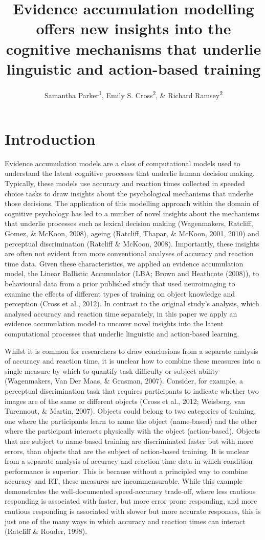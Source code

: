 \documentclass[
  man, donotrepeattitle,floatsintext]{apa6}
\title{Evidence accumulation modelling offers new insights into the cognitive mechanisms that underlie linguistic and action-based training}
\author{Samantha Parker\textsuperscript{1}, Emily S. Cross\textsuperscript{2}, \& Richard Ramsey\textsuperscript{2}}
\date{}
\affiliation{\vspace{0.5cm}\textsuperscript{1} Macquarie University\\\textsuperscript{2} ETH Zürich}
\begin{document}
\maketitle

\section{Introduction}\label{introduction}

Evidence accumulation models are a class of computational models used to understand the latent cognitive processes that underlie human decision making. Typically, these models use accuracy and reaction times collected in speeded choice tasks to draw insights about the psychological mechanisms that underlie those decisions. The application of this modelling approach within the domain of cognitive psychology has led to a number of novel insights about the mechanisms that underlie processes such as lexical decision making (Wagenmakers, Ratcliff, Gomez, \& McKoon, 2008), ageing (Ratcliff, Thapar, \& McKoon, 2001, 2010) and perceptual discrimination (Ratcliff \& McKoon, 2008). Importantly, these insights are often not evident from more conventional analyses of accuracy and reaction time data. Given these characteristics, we applied an evidence accumulation model, the Linear Ballistic Accumulator (LBA; Brown and Heathcote (2008)), to behavioural data from a prior published study that used neuroimaging to examine the effects of different types of training on object knowledge and perception (Cross et al., 2012). In contrast to the original study's analysis, which analysed accuracy and reaction time separately, in this paper we apply an evidence accumulation model to uncover novel insights into the latent computational processes that underlie linguistic and action-based learning.

Whilst it is common for researchers to draw conclusions from a separate analysis of accuracy and reaction time, it is unclear how to combine these measures into a single measure by which to quantify task difficulty or subject ability (Wagenmakers, Van Der Maas, \& Grasman, 2007). Consider, for example, a perceptual discrimination task that requires participants to indicate whether two images are of the same or different objects (Cross et al., 2012; Weisberg, van Turennout, \& Martin, 2007). Objects could belong to two categories of training, one where the participants learn to name the object (name-based) and the other where the participant interacts physically with the object (action-based). Objects that are subject to name-based training are discriminated faster but with more errors, than objects that are the subject of action-based training. It is unclear from a separate analysis of accuracy and reaction time data in which condition performance is superior. This is because without a principled way to combine accuracy and RT, these measures are incommensurable. While this example demonstrates the well-documented speed-accuracy trade-off, where less cautious responding is associated with faster, but more error prone responding, and more cautious responding is associated with slower but more accurate responses, this is just one of the many ways in which accuracy and reaction times can interact (Ratcliff \& Rouder, 1998).
\end{document}
